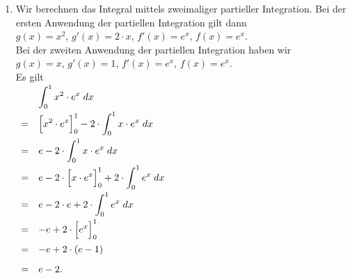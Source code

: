 \documentclass{article}
\newcommand{\ds}{\displaystyle}
\begin{document}
\begin{enumerate}
\item Wir berechnen das Integral mittels zweimaliger partieller Integration.  
      Bei der ersten Anwendung der partiellen Integration gilt dann
      \\[0.2cm]
      \hspace*{1.3cm}
      $g(x) = x^2$, $g'(x) = 2 \cdot x$, \quad $f'(x) = e^x$, $f(x) = e^x$.
      \\[0.2cm]
      Bei der zweiten Anwendung der partiellen Integration haben wir
      \\[0.2cm]
      \hspace*{1.3cm}
      $g(x) = x$, $g'(x) = 1$, \quad $f'(x) = e^x$, $f(x) = e^x$.
      \\[0.2cm]
      Es gilt
      \\[0.2cm]
      \hspace*{1.3cm}
      $
      \begin{array}[t]{cl}
        & \ds \int_{0}^{1} x^2 \cdot e^x \; dx                                   \\[0.3cm]
      = & \ds \Bigl[x^2 \cdot e^x\Bigr]_0^1 - 2 \cdot \int_{0}^{1} x \cdot e^x \; dx   \\[0.3cm]
      = & \ds e - 2 \cdot \int_{0}^{1} x \cdot e^x \; dx                          \\[0.3cm]
      = & \ds e - 2 \cdot \Bigl[x \cdot e^x\Bigr]_0^1 + 2 \cdot \int_{0}^{1} e^x \; dx  \\[0.3cm]
      = & \ds e - 2 \cdot e + 2 \cdot \int_{0}^{1} e^x \; dx                      \\[0.3cm]
      = & \ds -e + 2 \cdot \Bigl[ e^x \Bigr]_0^1                             \\[0.3cm]
      = & \ds -e + 2 \cdot (e - 1)                              \\[0.3cm]
      = & e - 2.        
      \end{array}
      $
\end{enumerate}
\end{document}
